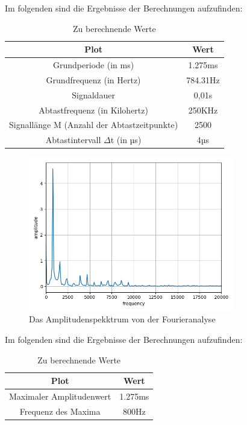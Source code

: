 \documentclass[12pt, oneside, a4paper, \docLanguage]{report}
\begin{document}
Im folgenden sind die Ergebnisse der Berechnungen aufzufinden:
\begin{table}[H]
	\centering\small
	\begin{tabular}{|c|c|}
	\hline
	Plot & Wert \\
	\hline
	Grundperiode (in ms) & 1.275ms \\
	\hline
	Grundfrequenz (in Hertz) & 784.31Hz \\
	\hline
	Signaldauer &  0,01s\\
	\hline
	Abtastfrequenz (in Kilohertz) &  250KHz\\
	\hline
	Signallänge M (Anzahl der Abtastzeitpunkte) & 2500 \\
	\hline
	Abtastintervall $\Delta$t (in µs) & 4µs \\
	\hline
	\end{tabular}
	\caption{Zu berechnende Werte}
	\label{fig:VERSUCH_1_MESSWERTE}
\end{table}
\newpage
\begin{figure}[H]
	\centering\small
	\includegraphics[width=0.8\textwidth]{../data/img/mundharmonika2.png}
	\caption{Das Amplitudenspekktrum von der Fourieranalyse}
	\label{img:Das Amplitudenspekktrum von der Fourieranalyse}
\end{figure}

Im folgenden sind die Ergebnisse der Berechnungen aufzufinden:
\begin{table}[H]
	\centering\small
	\begin{tabular}{|c|c|}
	\hline
	Plot & Wert \\
	\hline
	Maximaler Amplitudenwert & 1.275ms \\
	\hline
	Frequenz des Maxima & 800Hz \\
	\hline
	\end{tabular}
	\caption{Zu berechnende Werte}
	\label{fig:VERSUCH_1_MESSWERTE}
\end{table}
\end{document}
